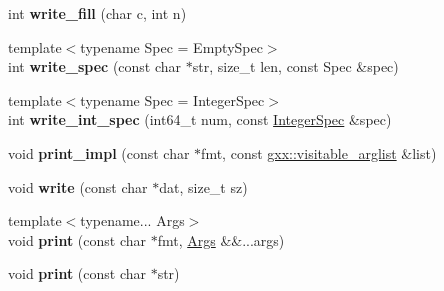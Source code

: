 \begin{DoxyCompactItemize}
\item 
int {\bfseries write\+\_\+fill} (char c, int n)\hypertarget{classgxx_1_1io_1_1format__writer_a926d75097a61a778c425089993efb5f9}{}\label{classgxx_1_1io_1_1format__writer_a926d75097a61a778c425089993efb5f9}

\item 
{\footnotesize template$<$typename Spec  = Empty\+Spec$>$ }\\int {\bfseries write\+\_\+spec} (const char $\ast$str, size\+\_\+t len, const Spec \&spec)\hypertarget{classgxx_1_1io_1_1format__writer_a0a6b5523382a408f3e8a281f42fd9c1f}{}\label{classgxx_1_1io_1_1format__writer_a0a6b5523382a408f3e8a281f42fd9c1f}

\item 
{\footnotesize template$<$typename Spec  = Integer\+Spec$>$ }\\int {\bfseries write\+\_\+int\+\_\+spec} (int64\+\_\+t num, const \hyperlink{classgxx_1_1io_1_1IntegerSpec}{Integer\+Spec} \&spec)\hypertarget{classgxx_1_1io_1_1format__writer_ad142c2af00de5de8420250bedc2ae445}{}\label{classgxx_1_1io_1_1format__writer_ad142c2af00de5de8420250bedc2ae445}

\item 
void {\bfseries print\+\_\+impl} (const char $\ast$fmt, const \hyperlink{classgxx_1_1visitable__arglist}{gxx\+::visitable\+\_\+arglist} \&list)\hypertarget{classgxx_1_1io_1_1format__writer_a3eee8456b416a3fd51b17cb616c358df}{}\label{classgxx_1_1io_1_1format__writer_a3eee8456b416a3fd51b17cb616c358df}

\item 
void {\bfseries write} (const char $\ast$dat, size\+\_\+t sz)\hypertarget{classgxx_1_1io_1_1format__writer_a9e2e3248af80fb6924ffd1c8da40945b}{}\label{classgxx_1_1io_1_1format__writer_a9e2e3248af80fb6924ffd1c8da40945b}

\item 
{\footnotesize template$<$typename... Args$>$ }\\void {\bfseries print} (const char $\ast$fmt, \hyperlink{structArgs}{Args} \&\&...args)\hypertarget{classgxx_1_1io_1_1format__writer_a8e74d35d303875e1b1c5f2cb0d768a17}{}\label{classgxx_1_1io_1_1format__writer_a8e74d35d303875e1b1c5f2cb0d768a17}

\item 
void {\bfseries print} (const char $\ast$str)\hypertarget{classgxx_1_1io_1_1format__writer_a400643ef00c00601f672569d73882b71}{}\label{classgxx_1_1io_1_1format__writer_a400643ef00c00601f672569d73882b71}


\end{DoxyCompactItemize}
